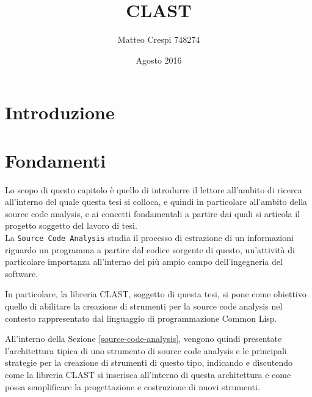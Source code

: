 \documentclass{book}
\title{CLAST}
\author{Matteo Crespi 748274}
\date{Agosto 2016}
\begin{document}
\maketitle

\pagestyle{plain}

\newpage

\tableofcontents
\listoffigures
\lstlistoflistings

\cleardoublepage

\pagestyle{headings}

\chapter{Introduzione}





\begingroup
\let\clearpage\relax

\chapter{Fondamenti}

Lo scopo di questo capitolo è quello di introdurre il lettore all’ambito di
ricerca all’interno del quale questa tesi si colloca, e quindi in particolare
all’ambito della source code analysis, e ai concetti fondamentali a partire dai
quali si articola il progetto soggetto del lavoro di tesi.\\

La \texttt{Source Code Analysis} studia il processo di estrazione di un
informazioni riguardo un programma a partire dal codice sorgente di questo,
un’attività di particolare importanza all'interno del più ampio campo
dell'ingegneria del software.

In particolare, la libreria CLAST, soggetto di questa tesi, si pone come
obiettivo quello di abilitare la creazione di strumenti per la source code
analysis nel contesto rappresentato dal linguaggio di programmazione Common
Lisp.

All'interno della Sezione \ref{source-code-analysis}, vengono quindi presentate
l'architettura tipica di uno strumento di source code analysis e le principali
strategie per la creazione di strumenti di questo tipo, indicando e discutendo
come la libreria CLAST si inserisca all'interno di questa architettura e come
possa semplificare la progettazione e costruzione di nuovi strumenti.\\
\end{document}
